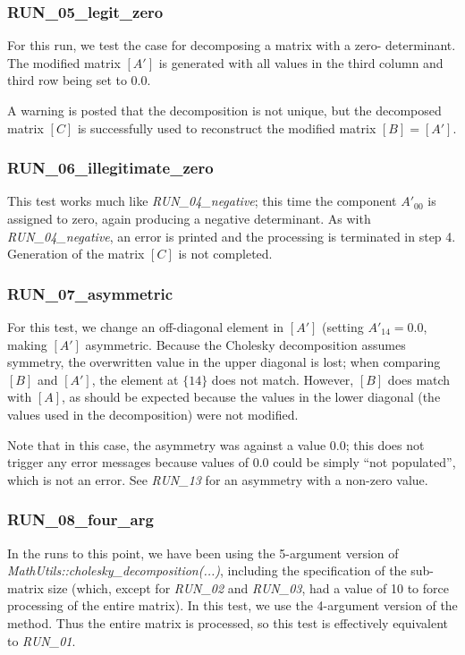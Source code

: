\documentclass[11pt,fleqn]{report}
\begin{document}
\subsubsection{RUN\_05\_legit\_zero}
For this run, we test the case for decomposing a matrix with a
zero- determinant. The modified matrix $[A']$ is generated with all
values in the third column and third row being set to 0.0.

A warning is posted that the decomposition is not unique, but the decomposed
matrix $[C]$ is successfully used to reconstruct the modified matrix $[B] =
[A']$.

\subsubsection{RUN\_06\_illegitimate\_zero}
This test works much like \textit{RUN\_04\_negative}; this time the component
$A'_{00}$ is assigned to zero, again producing a negative determinant. As
with \textit{RUN\_04\_negative}, an error is printed and the processing
is terminated in step 4. Generation of the matrix $[C]$ is not completed.

\subsubsection{RUN\_07\_asymmetric}
For this test, we change an off-diagonal element in $[A']$ (setting
$A'_{14} = 0.0$, making $[A']$ asymmetric. Because the Cholesky decomposition
assumes symmetry, the overwritten value in the upper diagonal is lost; when
comparing $[B]$ and $[A']$, the element at $\{14\}$ does not match. However,
$[B]$ does match with $[A]$, as should be expected because the values in the
lower diagonal (the values used in the decomposition) were not modified.

Note that in this case, the asymmetry was against a value 0.0; this does not
trigger any error messages because values of 0.0 could be simply ``not
populated'', which is not an error. See \textit{RUN\_13} for an asymmetry with
a non-zero value.

\subsubsection{RUN\_08\_four\_arg}
In the runs to this point, we have been using the 5-argument version of
\newline
\textit{MathUtils::cholesky\_decomposition(...)}, including the specification
of the sub-matrix size (which, except for \textit{RUN\_02} and
\textit{RUN\_03}, had a value of
10 to force processing of the entire matrix). In this test, we use the
4-argument version of the method. Thus the
entire matrix is processed, so this test is effectively equivalent to
\textit{RUN\_01}.
\end{document}
